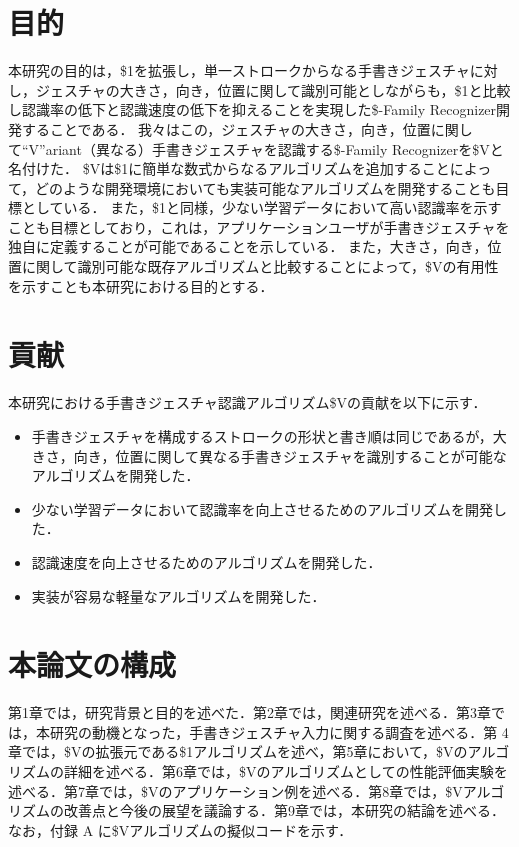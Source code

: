\section{目的}
本研究の目的は，\$1を拡張し，単一ストロークからなる手書きジェスチャに対し，ジェスチャの大きさ，向き，位置に関して識別可能としながらも，\$1と比較し認識率の低下と認識速度の低下を抑えることを実現した\$-Family Recognizer開発することである．
我々はこの，ジェスチャの大きさ，向き，位置に関して``V''ariant（異なる）手書きジェスチャを認識する\$-Family Recognizerを\$Vと名付けた．
\$Vは\$1に簡単な数式からなるアルゴリズムを追加することによって，どのような開発環境においても実装可能なアルゴリズムを開発することも目標としている．
また，\$1と同様，少ない学習データにおいて高い認識率を示すことも目標としており，これは，アプリケーションユーザが手書きジェスチャを独自に定義することが可能であることを示している．
また，大きさ，向き，位置に関して識別可能な既存アルゴリズムと比較することによって，\$Vの有用性を示すことも本研究における目的とする．



\section{貢献}
本研究における手書きジェスチャ認識アルゴリズム\$Vの貢献を以下に示す．
\begin{itemize}
\item 手書きジェスチャを構成するストロークの形状と書き順は同じであるが，大きさ，向き，位置に関して異なる手書きジェスチャを識別することが可能なアルゴリズムを開発した．
\item 少ない学習データにおいて認識率を向上させるためのアルゴリズムを開発した．
\item 認識速度を向上させるためのアルゴリズムを開発した．
\item 実装が容易な軽量なアルゴリズムを開発した．
\end{itemize}

\section{本論文の構成}
第1章では，研究背景と目的を述べた．第2章では，関連研究を述べる．第3章では，本研究の動機となった，手書きジェスチャ入力に関する調査を述べる．第 4 章では，\$Vの拡張元である\$1アルゴリズムを述べ，第5章において，\$Vのアルゴリズムの詳細を述べる．第6章では，\$Vのアルゴリズムとしての性能評価実験を述べる．第7章では，\$Vのアプリケーション例を述べる．第8章では，\$Vアルゴリズムの改善点と今後の展望を議論する．第9章では，本研究の結論を述べる．
なお，付録 A に\$Vアルゴリズムの擬似コードを示す．
